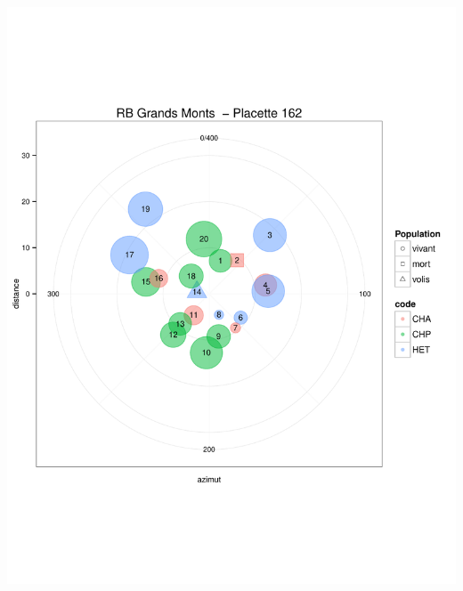 \documentclass[a4paper]{book}\usepackage[]{graphicx}\usepackage[]{color}
\makeatletter
\def\maxwidth{ %
  \ifdim\Gin@nat@width>\linewidth
    \linewidth
  \else
    \Gin@nat@width
  \fi
}
\newenvironment{knitrout}{}{} %
\makeatother
\begin{document}
\begin{knitrout}
{\centering \includegraphics[width=\maxwidth]{Figures/PlanArbres-15} 

}





\end{knitrout}
\end{document}
